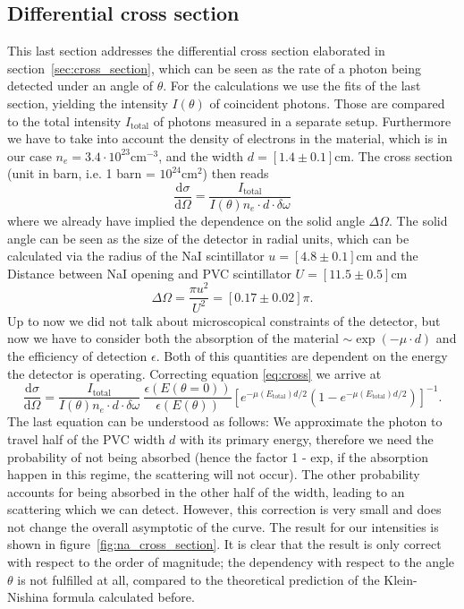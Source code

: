 \subsection{Differential cross section}
\label{sub:cross_section}
This last section addresses the differential cross section elaborated in section~\ref{sec:cross_section}, which can
be seen as the rate of a photon being detected under an angle of $\theta$. 
For the calculations
we use the fits of the last section, yielding the intensity $I(\theta)$ of coincident photons. Those are compared to the total
intensity $I_\mathrm{total}$ of photons measured in a separate setup. Furthermore we have to take into account the density of
electrons in the material, which is in our case $n_e= 3.4\cdot10^{23}\mathrm{cm}^{-3}$, and the width $d = [1.4 \pm 0.1]$cm. 
The cross section (unit in barn, i.e. 1 barn = $10^{24}\mathrm{cm}^{2}$) then reads
\begin{equation}
    \label{eq:cross}
    \frac{\mathrm{d}\sigma}{\mathrm{d} \Omega} = \frac{I_\mathrm{total}}{I(\theta) n_e \cdot d \cdot \delta \omega}
\end{equation}
where we already have implied the dependence on the solid angle $\Delta \Omega$. The solid angle can be seen as the size of the
detector in radial units, which can be calculated via the radius of the NaI scintillator $u=[4.8\pm0.1]$cm and the Distance
between NaI opening and PVC scintillator $U=[11.5\pm0.5]$cm
\begin{equation}
    \Delta \Omega = \frac{\pi u^2}{U^2}  = [0.17 \pm 0.02] \pi.
\end{equation}
Up to now we did not talk about microscopical constraints of the detector, but now we have to consider both the absorption
of the material $\sim \exp(-\mu \cdot d)$ and the efficiency of detection $\epsilon$. Both of this quantities are dependent on the
energy the detector is operating. Correcting equation \eqref{eq:cross} we arrive at
\begin{equation}
\label{eq:diff_cross}
    \frac{\mathrm{d} \sigma}{\mathrm{d} \Omega} = \frac{I_\mathrm{total}}{I(\theta) n_e \cdot d \cdot \delta \omega} \
    \frac{\epsilon(E(\theta = 0 ))}{\epsilon(E(\theta))} \left[ e^{-\mu(E_{\mathrm{total} }) d/2}
    \left( 1 - e^{-\mu(E_{\mathrm{total} }) d/2}  \right)\right]^{-1}.
\end{equation}
The last equation can be understood as follows: We approximate the photon to travel half of the PVC width $d$ with its
primary energy, therefore we need the probability of not being absorbed (hence the factor 1 - exp, if the absorption happen 
in this regime, the scattering will not occur). The other probability accounts for being absorbed in the other half of the width,
leading to an scattering which we can detect. However, this correction is very small and does not change the overall asymptotic
of the curve. The result for our intensities is shown in figure~\ref{fig:na_cross_section}. It is clear that the result is only
correct with respect to the order of magnitude; the dependency with respect to the angle $\theta$ is not fulfilled at all, 
compared to the theoretical prediction of the Klein-Nishina formula calculated before. 

